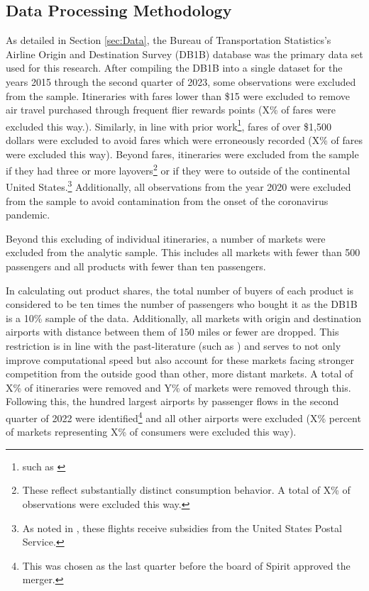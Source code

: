 \documentclass{article}
\begin{document}
\pagebreak	\begin{appendices}
	
	\section{Data Processing Methodology}
	\label{sec:DataProcessing}
	As detailed in Section \ref{sec:Data},	the Bureau of Transportation Statistics's Airline Origin and Destination Survey (DB1B) database was the primary data set used for this research. After compiling the DB1B into a single dataset for the years 2015 through the second quarter of 2023, some observations were excluded from the sample. Itineraries with fares lower than \$15 were excluded to remove air travel purchased through frequent flier rewards points ({X}\% of fares were excluded this way.). Similarly, in line with prior work\footnote{such as \citet{berry_tracing_2010}}, fares of over \$1,500 dollars were excluded to avoid fares which were erroneously recorded (X\% of fares were excluded this way). Beyond fares, itineraries were excluded from the sample if they had three or more layovers\footnote{These reflect substantially distinct consumption behavior. A total of X\% of observations were excluded this way.} or if they were to outside of the continental United States.\footnote{As noted in \citet{ciliberto_market_2021}, these flights receive subsidies from the United States Postal Service.} Additionally, all observations from the year 2020 were excluded from the sample to avoid contamination from the onset of the coronavirus pandemic.
	
	Beyond this excluding of individual itineraries, a number of markets were excluded from the analytic sample. This includes all markets with fewer than 500 passengers and all products with fewer than ten passengers. 
	
	In calculating out product shares, the total number of buyers of each product is considered to be ten times the number of passengers who bought it as the DB1B is a 10\% sample of the data. Additionally, all markets with origin and destination airports with distance between them of 150 miles or fewer are dropped. This restriction is in line with the past-literature (such as \citet{ciliberto_does_2014}) and serves to not only improve computational speed but also account for these markets facing stronger competition from the outside good than other, more distant markets. A total of {X}\% of itineraries were removed and Y\% of markets were removed through this. Following this, the hundred largest airports by passenger flows in the second quarter of 2022 were identified\footnote{This was chosen as the last quarter before the board of Spirit approved the merger.} and all other airports were excluded (X\% percent of markets representing X\% of consumers were excluded this way). 
	

\end{appendices}
\end{document}
